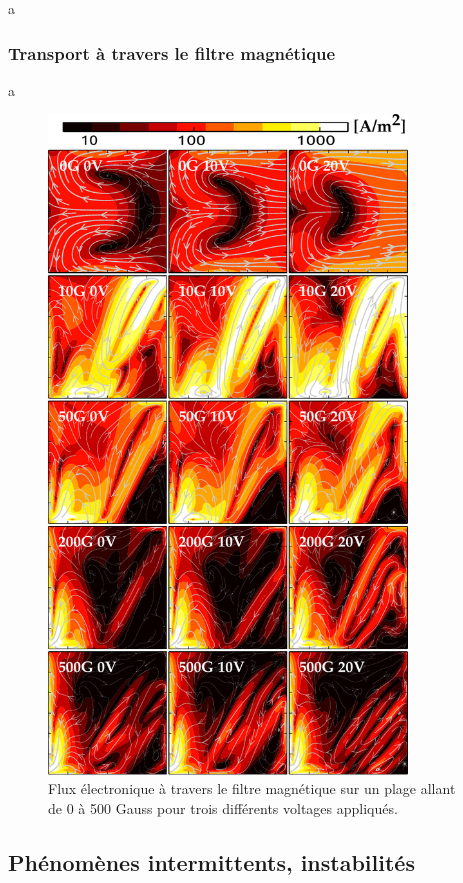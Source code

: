 \begin{refsection}
	a
	
	\subsubsection{Transport à travers le filtre magnétique}
	a
	
	\begin{figure}[htbp]
	\centering
	\includegraphics[width=0.85\textwidth]{figures/4-pegasesfluxElectronique.pdf}
	{\caption{Flux électronique à travers le filtre magnétique sur un plage
	allant de 0 à 500 Gauss pour trois différents voltages appliqués.}
	\label{4-pegasesfluxElectronique}}
	\end{figure}
\subsection{Phénomènes intermittents, instabilités}

\end{refsection}
